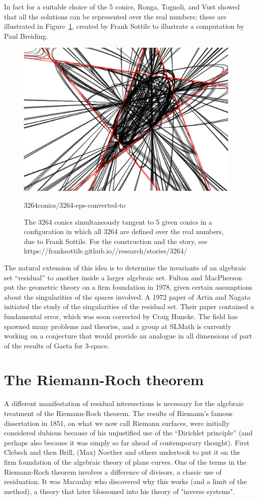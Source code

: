 \documentclass[11pt, oneside]{article}   	%
\begin{document}
In fact for a suitable choice of the 5 conics, 
 Ronga, Tognoli, and Vust showed that all the solutions can be represented over the real numbers; 
 these are illustrated in Figure~\ref{102Conics}, created by Frank Sottile to illustrate  a computation by Paul Breiding. 
 
\begin{figure}\label{102Conics}
\centerline {\includegraphics[height=3in]{3264conics/3264-eps-converted-to}}
3264conics/3264-eps-converted-to
 \caption{The 3264 conics simultaneously tangent to 5 given conics in 
 a configuration in which all 3264 are defined over the real numbers, due to 
 Frank Sottile. For the construction and the story, see 
 https://franksottile.github.io//research/stories/3264/}
\end{figure}

The natural extension of this idea is to determine the invariants of an algebraic set ``residual'' to another inside a larger algebraic set. Fulton and MacPherson put the geometric theory on a firm foundation in 1978, given certain assumptions about the singularities of the spaces involved. A 1972 paper of Artin and Nagata initiated the study of the singularities of the residual set. Their paper contained a fundamental error, which was soon corrected by Craig Huneke. The field has spawned many problems and theories, and a group at SLMath is currently working on a conjecture that would provide an analogue in all dimensions of part of the results of Gaeta for 3-space.

\section{The Riemann-Roch theorem}
A different manifestation of residual intersections is necessary for the algebraic treatment of the Riemann-Roch theorem. The results of Riemann's famous dissertation in 1851, on what we now call Riemann surfaces, were initially considered
dubious because of his unjustified use of the ``Dirichlet principle'' (and perhaps also because it was simply so far ahead of contemporary thought). First Clebsch and then Brill, (Max) Noether and others undertook to put it on the firm foundation of the algebraic theory of plane curves. One of the terms in the Riemann-Roch theorem involves a difference of divisors, a classic use of residuation. It was Macaulay
who discovered why this works (and a limit of the method), a theory that later blossomed into his theory of "inverse systems".
\end{document}
